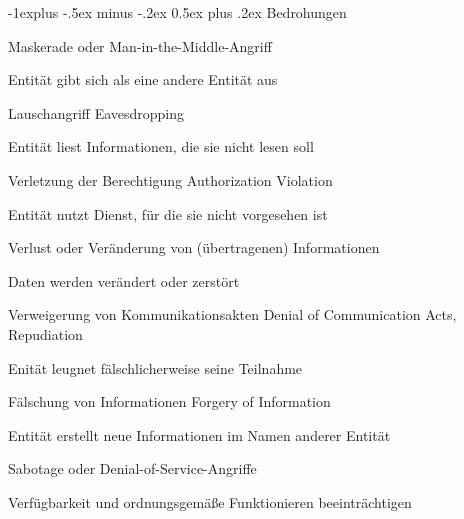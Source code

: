 \documentclass[a4paper]{article}
\makeatletter
\renewcommand{\subsection}{\@startsection{subsection}{2}{0mm}%
 {-1explus -.5ex minus -.2ex}%
 {0.5ex plus .2ex}%
 {\normalfont\normalsize\bfseries}}
\makeatother
\begin{document}
\begin{multicols}{3}
      \subsection{Bedrohungen}
      \begin{description*}
            \item[Maskerade] oder Man-in-the-Middle-Angriff
            \begin{itemize*}
                  \item Entität gibt sich als eine andere Entität aus
            \end{itemize*}
            \item[Lauschangriff] Eavesdropping
            \begin{itemize*}
                  \item Entität liest Informationen, die sie nicht lesen soll
            \end{itemize*}
            \item[Verletzung der Berechtigung] Authorization Violation
            \begin{itemize*}
                  \item Entität nutzt Dienst, für die sie nicht vorgesehen ist
            \end{itemize*}
            \item[Verlust oder Veränderung] von (übertragenen) Informationen
            \begin{itemize*}
                  \item Daten werden verändert oder zerstört
            \end{itemize*}
            \item[Verweigerung von Kommunikationsakten] Denial of Communication Acts, Repudiation
            \begin{itemize*}
                  \item Enität leugnet fälschlicherweise seine Teilnahme %
            \end{itemize*}
            \item[Fälschung von Informationen] Forgery of Information
            \begin{itemize*}
                  \item Entität erstellt neue Informationen im Namen anderer Entität
            \end{itemize*}
            \item[Sabotage] oder Denial-of-Service-Angriffe
            \begin{itemize*}
                  \item Verfügbarkeit und ordnungsgemäße Funktionieren beeinträchtigen
            \end{itemize*}
      \end{description*}


\end{multicols}
\end{document}
